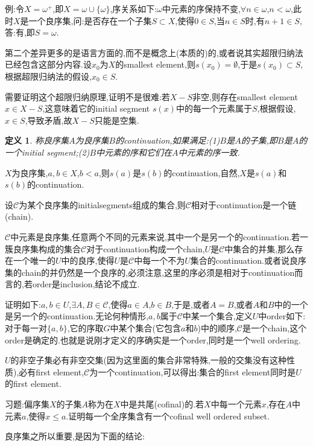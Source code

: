 \documentclass[12pt,a4paper,openany]{book}
\newtheorem{definition}{定义}[section]
\begin{document}
例:令$X = \omega^+$,即$X=\omega \cup \{\omega\}$,序关系如下:$\omega$中元素的序保持不变,$\forall n \in \omega$,$n < \omega$,此时$X$是一个良序集,问:是否存在一个子集$S \subset X$,使得$0 \in S$,当$n \in S$时,有$n+1 \in S$,答:有,即$S=\omega$.

第二个差异更多的是语言方面的,而不是概念上(本质的)的,或者说其实超限归纳法已经包含这部分内容.设$x_0$为$X$的smallest element,则$s(x_0)=\emptyset$,于是$s(x_0) \subset S$,根据超限归纳法的假设,$x_0 \in S$.

需要证明这个超限归纳原理,证明不是很难:若$X-S$非空,则存在smallest element $x \in X-S$,这意味着它的initial segment $s(x)$中的每一个元素属于$S$,根据假设,$x \in S$,导致矛盾,故$X-S$只能是空集.

\begin{definition}
称良序集$A$为良序集$B$的continuation,如果满足:(1)$B$是$A$的子集,即$B$是$A$的一个initial segment;(2)$B$中元素的序和它们在$A$中元素的序一致.
\end{definition}

$X$为良序集,$a,b \in X$,$b<a$,则$s(a)$是$s(b)$的continuation,自然,$X$是$s(a)$和$s(b)$的continuation.

设$\mathscr{C}$为某个良序集的initialsegments组成的集合,则$\mathscr{C}$相对于continuation是一个链(chain).

$\mathscr{C}$中元素是良序集,任意两个不同的元素来说,其中一个是另一个的continuation.若一簇良序集构成的集合$\mathscr{C}$对于continuation构成一个chain,$U$是$\mathscr{C}$中集合的并集,那么存在一个唯一的$U$中的良序,使得$U$是$\mathscr{C}$中每一个不为$U$集合的continuation.或者说良序集的chain的并仍然是一个良序的,必须注意,这里的序必须是相对于continuation而言的,若order是inclusion,结论不成立.

证明如下:$a,b \in U$,$\exists A, B \in \mathscr{C}$,使得$a \in A$,$b \in B$,于是,或者$A=B$,或者$A$和$B$中的一个是另一个的continuation.无论何种情形,$a,b$属于$\mathscr{C}$中某一个集合,定义$U$中order如下:对于每一对$\{a,b\}$,它的序取$G$中某个集合(它包含$a$和$b$)中的顺序,$\mathscr{C}$是一个chain,这个order是确定的.也就是说刚才定义的序确实是一个order,同时是一个well ordering.

$U$的非空子集必有非空交集(因为这里面的集合非常特殊,一般的交集没有这种性质),必有first element,$\mathscr{C}$为一个continuation,可以得出:集合的first element同时是$U$的first element.

习题:偏序集$X$的子集$A$称为在$X$中是共尾(cofinal)的.若$X$中每一个元素$x$,存在$A$中元素$a$,使得$x \le a$.证明每一个全序集含有一个cofinal well ordered subset.

良序集之所以重要,是因为下面的结论:
\end{document}
